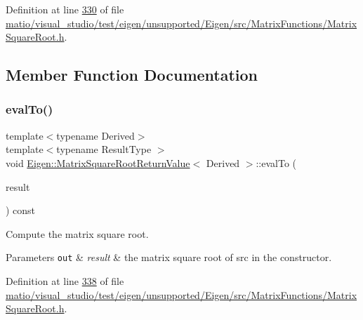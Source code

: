 Definition at line \hyperlink{matio_2visual__studio_2test_2eigen_2unsupported_2_eigen_2src_2_matrix_functions_2_matrix_square_root_8h_source_l00330}{330} of file \hyperlink{matio_2visual__studio_2test_2eigen_2unsupported_2_eigen_2src_2_matrix_functions_2_matrix_square_root_8h_source}{matio/visual\+\_\+studio/test/eigen/unsupported/\+Eigen/src/\+Matrix\+Functions/\+Matrix\+Square\+Root.\+h}.



\subsection{Member Function Documentation}
\mbox{\label{class_eigen_1_1_matrix_square_root_return_value_a97577165569edcf19429c7748b670e51}} 
\subsubsection{\texorpdfstring{eval\+To()}{evalTo()}\hspace{0.1cm}{\footnotesize\ttfamily [1/2]}}
{\footnotesize\ttfamily template$<$typename Derived$>$ \\
template$<$typename Result\+Type $>$ \\
void \hyperlink{class_eigen_1_1_matrix_square_root_return_value}{Eigen\+::\+Matrix\+Square\+Root\+Return\+Value}$<$ Derived $>$\+::eval\+To (\begin{DoxyParamCaption}\item[{Result\+Type \&}]{result }\end{DoxyParamCaption}) const\hspace{0.3cm}{\ttfamily [inline]}}



Compute the matrix square root. 


\begin{DoxyParams}[1]{Parameters}
\mbox{\tt out}  & {\em result} & the matrix square root of {\ttfamily src} in the constructor. \\
\hline
\end{DoxyParams}


Definition at line \hyperlink{matio_2visual__studio_2test_2eigen_2unsupported_2_eigen_2src_2_matrix_functions_2_matrix_square_root_8h_source_l00338}{338} of file \hyperlink{matio_2visual__studio_2test_2eigen_2unsupported_2_eigen_2src_2_matrix_functions_2_matrix_square_root_8h_source}{matio/visual\+\_\+studio/test/eigen/unsupported/\+Eigen/src/\+Matrix\+Functions/\+Matrix\+Square\+Root.\+h}.

